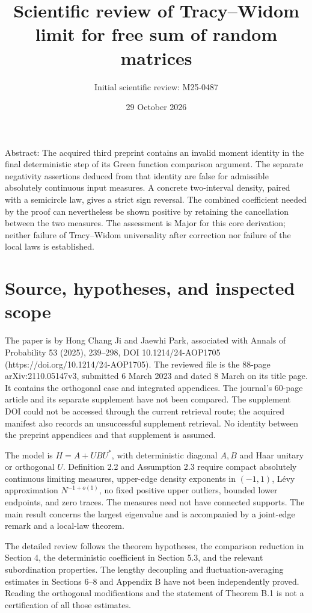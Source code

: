 \documentclass[10pt]{article}
\title{Scientific review of
Tracy–Widom limit for free sum of random matrices}
\author{Initial scientific review: M25-0487}
\date{29 October 2026}
\begin{document}
\maketitle
Abstract: The acquired third preprint contains an invalid moment identity in the final deterministic step of its Green function comparison argument. The separate negativity assertions deduced from that identity are false for admissible absolutely continuous input measures. A concrete two-interval density, paired with a semicircle law, gives a strict sign reversal. The combined coefficient needed by the proof can nevertheless be shown positive by retaining the cancellation between the two measures. The assessment is Major for this core derivation; neither failure of Tracy–Widom universality after correction nor failure of the local laws is established.\par
\section*{Source, hypotheses, and inspected scope}
The paper is by Hong Chang Ji and Jaewhi Park, associated with Annals of Probability 53 (2025), 239–298, DOI 10.1214/24-AOP1705 (https://doi.org/10.1214/24-AOP1705). The reviewed file is the 88-page arXiv:2110.05147v3, submitted 6 March 2023 and dated 8 March on its title page. It contains the orthogonal case and integrated appendices. The journal’s 60-page article and its separate supplement have not been compared. The supplement DOI could not be accessed through the current retrieval route; the acquired manifest also records an unsuccessful supplement retrieval. No identity between the preprint appendices and that supplement is assumed.\par
The model is \(H=A+UBU^*\), with deterministic diagonal \(A,B\) and Haar unitary or orthogonal \(U\). Definition 2.2 and Assumption 2.3 require compact absolutely continuous limiting measures, upper-edge density exponents in \((-1,1)\), Lévy approximation \(N^{-1+o(1)}\), no fixed positive upper outliers, bounded lower endpoints, and zero traces. The measures need not have connected supports. The main result concerns the largest eigenvalue and is accompanied by a joint-edge remark and a local-law theorem.\par
The detailed review follows the theorem hypotheses, the comparison reduction in Section 4, the deterministic coefficient in Section 5.3, and the relevant subordination properties. The lengthy decoupling and fluctuation-averaging estimates in Sections 6–8 and Appendix B have not been independently proved. Reading the orthogonal modifications and the statement of Theorem B.1 is not a certification of all those estimates.\par
\end{document}
